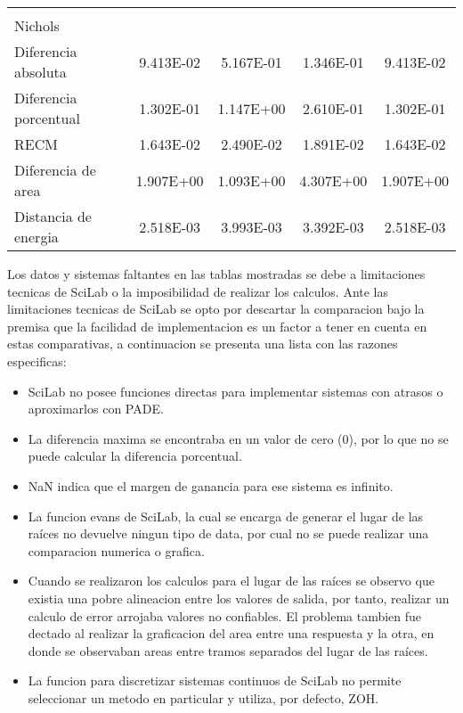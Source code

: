 {\begin{longtable}{l @{\extracolsep{\fill}} cccc}
            & & & & \\
            Nichols                & & & & \\ \cmidrule{1-1}
            Diferencia absoluta    & \num{9.413E-02} & \num{5.167E-01} & \num{1.346E-01} & \num{9.413E-02}  \\
            Diferencia porcentual  & \num{1.302E-01} & \num{1.147E+00} & \num{2.610E-01} & \num{1.302E-01}  \\
            RECM                   & \num{1.643E-02} & \num{2.490E-02} & \num{1.891E-02} & \num{1.643E-02}  \\
            Diferencia de area     & \num{1.907E+00} & \num{1.093E+00} & \num{4.307E+00} & \num{1.907E+00}  \\
            Distancia de energia   & \num{2.518E-03} & \num{3.993E-03} & \num{3.392E-03} & \num{2.518E-03}  \\
        \end{longtable}}

        Los datos y sistemas faltantes en las tablas mostradas se debe a limitaciones tecnicas de SciLab o la imposibilidad de realizar los calculos. Ante las limitaciones tecnicas de SciLab se opto por descartar la comparacion bajo la premisa que la facilidad de implementacion es un factor a tener en cuenta en estas comparativas, a continuacion se presenta una lista con las razones especificas:

        \begin{itemize}[leftmargin=\parindent]
            \item SciLab no posee funciones directas para implementar sistemas con atrasos o aproximarlos con PADE.
            \item La diferencia maxima se encontraba en un valor de cero (0), por lo que no se puede calcular la diferencia porcentual.
            \item NaN indica que el margen de ganancia para ese sistema es infinito.
            \item La funcion evans de SciLab, la cual se encarga de generar el lugar de las raíces no devuelve ningun tipo de data, por cual no se puede realizar una comparacion numerica o grafica.
            \item Cuando se realizaron los calculos para el lugar de las raíces se observo que existia una pobre alineacion entre los valores de salida, por tanto, realizar un calculo de error arrojaba valores no confiables. El problema tambien fue dectado al realizar la graficacion del area entre una respuesta y la otra, en donde se observaban areas entre tramos separados del lugar de las raíces.
            \item La funcion para discretizar sistemas continuos de SciLab no permite seleccionar un metodo en particular y utiliza, por defecto, ZOH.
        \end{itemize}

